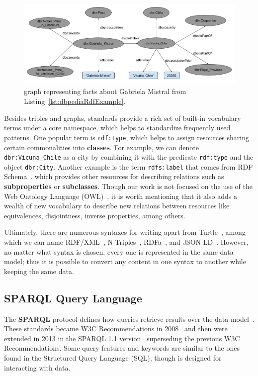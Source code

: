 \begin{figure}[!h]
    \centering
    \includegraphics[scale=.45]{imagenes/2_theorical_framework/exampleDbpediaGraph.png}
    \caption{\RDF{} graph representing facts about Gabriela Mistral from Listing~\ref{lst:dbpediaRdfExample}.}
    \label{fig:dbpediaGraphExample}
\end{figure}

Besides \RDF{} triples and \RDF{} graphs, \RDF{} standards provide a rich set of built-in 
vocabulary terms under a core \RDF{} namespace, which helps to standardize frequently used 
\RDF{} patterns. One popular term is \texttt{rdf:type}, which helps to assign resources 
sharing certain commonalities into \textbf{classes}. For example, we can denote 
\texttt{dbr:Vicuna\_Chile} as a city by combining it with the predicate \texttt{rdf:type} 
and the object \texttt{dbr:City}. Another example is the term \texttt{rdfs:label} that 
comes from RDF Schema~\cite{key:rdfsold}. which provides other resources for describing 
relations such as \textbf{subproperties} or \textbf{subclasses}. Though our work is not 
focused on the use of the Web Ontology Language (OWL)~\cite{key:owl2rationale, key:owloverview}, 
it is worth mentioning that it also adds a wealth of new vocabulary to describe new 
relations between resources like equivalences, disjointness, inverse properties, among others.

Ultimately, there are numerous syntaxes for writing \RDF{} apart from Turtle~\cite{key:turtle}, among 
which we can name RDF/XML~\cite{key:rdfxml}, N-Triples~\cite{key:testcases}, RDFa~\cite{key:rdfa11p, key:rdfa}, 
and JSON LD~\cite{key:jsonld}. However, no matter what syntax is chosen, every one is 
represented in the same \RDF{} data model; thus it is possible to convert any \RDF{} content 
in one syntax to another while keeping the same \RDF{} data.

\subsection{SPARQL Query Language}
\label{cap2:semWeb/sparql}
The \textbf{SPARQL} protocol defines how \SPARQL{} queries retrieve results over the \RDF{} 
data-model~\cite{key:sparql11protocol}. These standards became W3C Recommendations in 
2008~\cite{key:sparql} and then were extended in 2013 in the SPARQL 1.1 version~\cite{key:sparql11} 
superseding the previous W3C Recommendations. Some \SPARQL{} query features and keywords are similar 
to the ones found in the Structured Query Language (SQL), though \SPARQL{} is designed for interacting 
with \RDF{} data.

